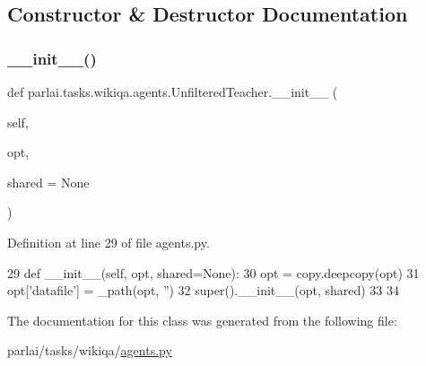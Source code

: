 \subsection{Constructor \& Destructor Documentation}
\mbox{\label{classparlai_1_1tasks_1_1wikiqa_1_1agents_1_1UnfilteredTeacher_a3f69b4069d4702ca92b2ce728f0e4ca4}} 
\subsubsection{\texorpdfstring{\+\_\+\+\_\+init\+\_\+\+\_\+()}{\_\_init\_\_()}}
{\footnotesize\ttfamily def parlai.\+tasks.\+wikiqa.\+agents.\+Unfiltered\+Teacher.\+\_\+\+\_\+init\+\_\+\+\_\+ (\begin{DoxyParamCaption}\item[{}]{self,  }\item[{}]{opt,  }\item[{}]{shared = {\ttfamily None} }\end{DoxyParamCaption})}



Definition at line 29 of file agents.\+py.


\begin{DoxyCode}
29     \textcolor{keyword}{def }\_\_init\_\_(self, opt, shared=None):
30         opt = copy.deepcopy(opt)
31         opt[\textcolor{stringliteral}{'datafile'}] = \_path(opt, \textcolor{stringliteral}{''})
32         super().\_\_init\_\_(opt, shared)
33 
34 
\end{DoxyCode}


The documentation for this class was generated from the following file\+:\begin{DoxyCompactItemize}
\item 
parlai/tasks/wikiqa/\hyperlink{parlai_2tasks_2wikiqa_2agents_8py}{agents.\+py}\end{DoxyCompactItemize}
